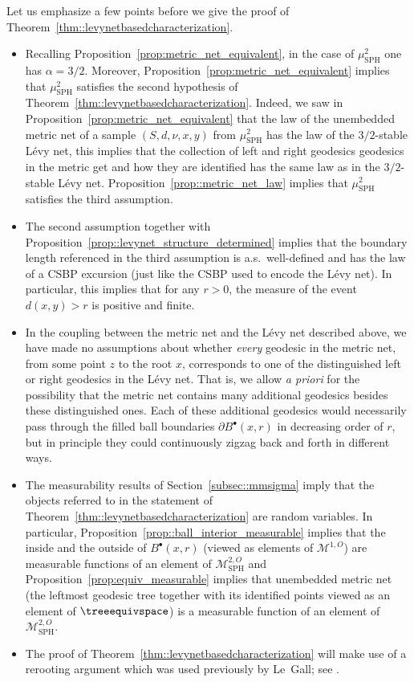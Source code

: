 \documentclass[10pt]{amsart}
\let\mathcal\mathscr
\newcommand{\sbullet}{{\scriptscriptstyle\bullet}}
\let\oldS\S
\theoremstyle{plain}
\numberwithin{theorem}{section}
\theoremstyle{definition}
\newcommand\gmsspace{{\mathcal M}_{\mathrm{SPH}}}
\newcommand\mmspace{{\mathcal M}}
\renewcommand{\S}{{\mathbf S}}
\newcommand{\mustwo}{\mu_{\mathrm{SPH}}^2}
\newcommand{\fb}[2]{B^\sbullet(#1,#2)}
\begin{document}
Let us emphasize a few points before we give the proof of Theorem~\ref{thm::levynetbasedcharacterization}.
\begin{itemize}
\item Recalling Proposition~\ref{prop:metric_net_equivalent}, in the case of $\mustwo$ one has $\alpha=3/2$. Moreover, Proposition~\ref{prop:metric_net_equivalent} implies that $\mustwo$ satisfies the second hypothesis of Theorem~\ref{thm::levynetbasedcharacterization}. Indeed, we saw in Proposition~\ref{prop:metric_net_equivalent} that the law of the unembedded metric net of a sample $(S,d,\nu,x,y)$ from $\mustwo$ has the law of the $3/2$-stable Lévy net, this implies that the collection of left and right geodesics geodesics in the metric get and how they are identified has the same law as in the $3/2$-stable Lévy net. Proposition~\ref{prop::metric_net_law} implies that $\mustwo$ satisfies the third assumption.
\item The second assumption together with Proposition~\ref{prop::levynet_structure_determined} implies that the boundary length referenced in the third assumption is a.s.\ well-defined and has the law of a CSBP excursion (just like the CSBP used to encode the Lévy net). In particular, this implies that for any $r>0$, the measure of the event $d(x,y)>r$ is positive and finite.
\item In the coupling between the metric net and the Lévy net described above, we have made no assumptions about whether \emph{every} geodesic in the metric net, from some point $z$ to the root $x$, corresponds to one of the distinguished left or right geodesics in the Lévy net. That is, we allow \emph{a priori} for the possibility that the metric net contains many additional geodesics besides these distinguished ones. Each of these additional geodesics would necessarily pass through the filled ball boundaries $\partial \fb{x}{r}$ in decreasing order of $r$, but in principle they could continuously zigzag back and forth in different ways.
\item The measurability results of Section~\ref{subsec::mmsigma} imply that the objects referred to in the statement of Theorem~\ref{thm::levynetbasedcharacterization} are random variables. In particular, Proposition~\ref{prop::ball_interior_measurable} implies that the inside and the outside of $\fb{x}{r}$ (viewed as elements of $\mmspace^{1,O}$) are measurable functions of an element of $\gmsspace^{2,O}$ and Proposition~\ref{prop:equiv_measurable} implies that unembedded metric net (\ie the leftmost geodesic tree together with its identified points viewed as an element of $\treeequivspace$) is a measurable function of an element of $\gmsspace^{2,O}$.
\item The proof of Theorem~\ref{thm::levynetbasedcharacterization} will make use of a rerooting argument which was used previously by Le~Gall; see \cite[\oldS 8.3]{legalluniqueanduniversal}.
\end{itemize}
\end{document}
